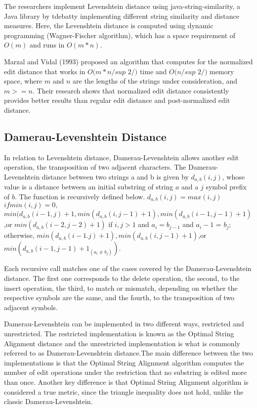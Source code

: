 The researchers implement Levenshtein distance using java-string-similarity, a Java library by tdebatty implementing different string similarity and distance measures. Here, the Levenshtein distance is computed using dynamic programming (Wagner-Fischer algorithm), which has a space requirement of $O(m)$ and runs in $O(m*n)$.

Marzal and Vidal (1993) proposed an algorithm that computes for the normalized edit distance that works in $O(m*n/sup$ $2/)$ time and $O(n/sup$ $2/)$ memory space, where $m$ and $n$ are the lengths of the strings under consideration, and $m>=n$. Their research shows that normalized edit distance consistently provides better results than regular edit distance and post-normalized edit distance.

\subsection{Damerau-Levenshtein Distance}
In relation to Levenshtein distance, Damerau-Levenshtein allows another edit operation, the transposition of two adjacent characters. The Damerau-Levenshtein distance between two strings a and b is given by $d_{a,b}(i,j)$, whose value is a distance between an initial substring of string $a$ and a $j$ symbol prefix of $b$. The function is recursively defined below.
$d_{a,b}(i,j) = max(i,j)$   $if min(i,j)=0,$ $min(d_{a,b}(i-1,j)+1,min(d_{a,b}(i,j-1)+1),min(d_{a,b}(i-1,j-1)+1)$,or $min(d_{a,b}(i-2,j-2)+1)$   if $i,j>1$ and $a_i = b_{j-1}$ and $a_i - 1$ = $b_j$; otherwise, $min(d_{a,b}(i-1.j)+1),min(d_{a,b}(i,j-1)+1)$,or $min(d_{a,b}(i-1,j-1)+1_{(a_i \neq b_j)})$.

Each recursive call matches one of the cases covered by the Damerau-Levenshtein distance. The first one corresponds to the delete operation, the second, to the insert operation, the third, to match or mismatch, depending on whether the respective symbols are the same, and the fourth, to the transposition of two adjacent symbols.

Damerau-Levenshtein can be implemented in two different ways, restricted and unrestricted. The restricted implementation is known as the Optimal String Alignment distance and the unrestricted implementation is what is commonly referred to as Damerau-Levenshtein distance.The main difference between the two implementations is that the Optimal String Alignment algorithm computes the number of edit operations under the restriction that no substring is edited more than once. Another key difference is that Optimal String Alignment algorithm is considered a true metric, since the triangle inequality does not hold, unlike the classic Damerau-Levenshtein.


